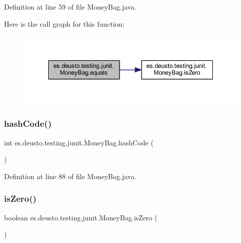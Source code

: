 Definition at line 59 of file Money\+Bag.\+java.

Here is the call graph for this function\+:\nopagebreak
\begin{figure}[H]
\begin{center}
\leavevmode
\includegraphics[width=348pt]{classes_1_1deusto_1_1testing_1_1junit_1_1_money_bag_a80926d10c9619bd2ad84eabe52ca03bb_cgraph}
\end{center}
\end{figure}
\mbox{\label{classes_1_1deusto_1_1testing_1_1junit_1_1_money_bag_ae2c0d290a37a617f0a07134bf95162eb}} 
\subsubsection{\texorpdfstring{hash\+Code()}{hashCode()}}
{\footnotesize\ttfamily int es.\+deusto.\+testing.\+junit.\+Money\+Bag.\+hash\+Code (\begin{DoxyParamCaption}{ }\end{DoxyParamCaption})}



Definition at line 88 of file Money\+Bag.\+java.

\mbox{\label{classes_1_1deusto_1_1testing_1_1junit_1_1_money_bag_abebc5bc39c3343cb3c4e5fb291fd5893}} 
\subsubsection{\texorpdfstring{is\+Zero()}{isZero()}}
{\footnotesize\ttfamily boolean es.\+deusto.\+testing.\+junit.\+Money\+Bag.\+is\+Zero (\begin{DoxyParamCaption}{ }\end{DoxyParamCaption})}

